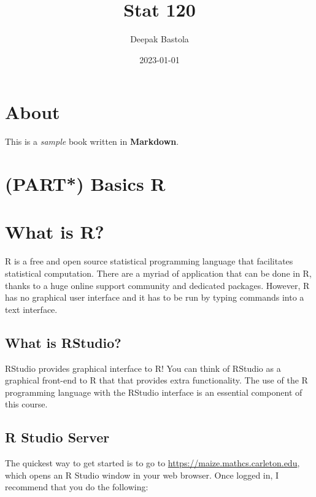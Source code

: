 \documentclass[
]{book}
\title{Stat 120}
\author{Deepak Bastola}
\date{2023-01-01}
\begin{document}
\maketitle

{
\setcounter{tocdepth}{1}
\tableofcontents
}
\hypertarget{about}{%
\chapter*{About}\label{about}}

This is a \emph{sample} book written in \textbf{Markdown}.

\hypertarget{part-basics-r}{%
\chapter{(PART*) Basics R}\label{part-basics-r}}

\hypertarget{what-is-r}{%
\chapter{What is R?}\label{what-is-r}}

R is a free and open source statistical programming language that facilitates statistical computation. There are a myriad of application that can be done in R, thanks to a huge online support community and dedicated packages. However, R has no graphical user interface and it has to be run by typing commands into a text interface.

\hypertarget{what-is-rstudio}{%
\section{What is RStudio?}\label{what-is-rstudio}}

RStudio provides graphical interface to R! You can think of RStudio as a graphical front-end to R that that provides extra functionality. The use of the R programming language with the RStudio interface is an essential component of this course.

\hypertarget{r-studio-server}{%
\section{R Studio Server}\label{r-studio-server}}

The quickest way to get started is to go to \url{https://maize.mathcs.carleton.edu}, which opens an R Studio window in your web browser. Once logged in, I recommend that you do the following:
\end{document}
